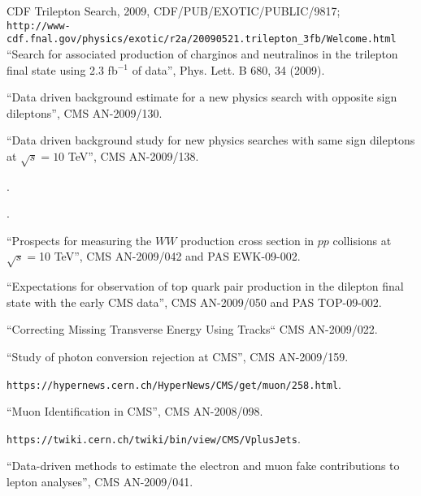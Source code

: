 \begin{thebibliography}{99}

 {CDF Trilepton Search, 2009, CDF/PUB/EXOTIC/PUBLIC/9817};\\
{\small \tt http://www-cdf.fnal.gov/physics/exotic/r2a/20090521.trilepton\_3fb/Welcome.html}
 {``Search for associated production of charginos and neutralinos in the trilepton final state using 2.3 fb$^{-1}$ of data'', Phys. Lett. B 680, 34 (2009).}

 {``Data driven background estimate for a new physics search with opposite sign dileptons''}, CMS AN-2009/130.

 {``Data driven background study for new physics searches with same sign dileptons at $\sqrt{s} = 10 $ TeV''}, CMS AN-2009/138.

.

.

 {``Prospects for measuring the $WW$ production cross section in $pp$ collisions at $\sqrt s = $10 TeV''}, CMS AN-2009/042 and PAS EWK-09-002.

 {``Expectations for observation of top quark pair production in the dilepton final state with the early CMS data''}, CMS AN-2009/050 and PAS TOP-09-002.

 {``Correcting Missing Transverse Energy Using Tracks``} CMS AN-2009/022.

 {``Study of photon conversion rejection at CMS''}, CMS AN-2009/159.

 {\tt https://hypernews.cern.ch/HyperNews/CMS/get/muon/258.html}.

 {``Muon Identification in CMS''}, CMS AN-2008/098.

 {\tt https://twiki.cern.ch/twiki/bin/view/CMS/VplusJets}.

 {``Data-driven methods to estimate the electron and muon fake contributions to lepton analyses''}, CMS AN-2009/041.


\end{thebibliography}
